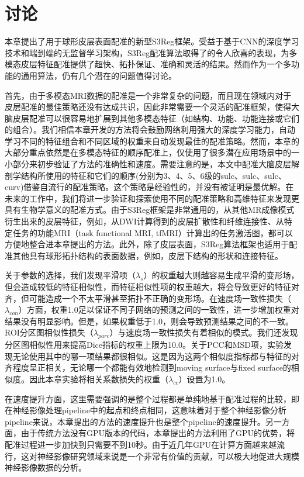 \section{讨论}
本章提出了用于球形皮层表面配准的新型S3Reg框架。受益于基于CNN的深度学习技术和端到端的无监督学习架构，S3Reg配准算法取得了的令人欣喜的表现，为多模态皮层特征配准提供了超快、拓扑保证、准确和灵活的结果。然而作为一个多功能的通用算法，仍有几个潜在的问题值得讨论。

首先，由于多模态MRI数据的配准是一个非常复杂的问题，而且现在领域内对于皮层配准的最佳策略还没有达成共识\cite{robinson2014msm,glasser2016multi}，因此非常需要一个灵活的配准框架，使得大脑皮层配准可以很容易地扩展到其他多模态特征（如结构、功能、功能连接或它们的组合）。我们相信本章开发的方法将会鼓励网络利用强大的深度学习能力，自动学习不同的特征组合和不同区域的权重来自动发现最佳的配准策略。然而，本章的大部分重点依然是在多模态特征的顺序配准上，仅使用了很多潜在应用场景中的一小部分来初步验证了方法的准确性和速度。需要注意的是，本文中配准大脑皮层解剖学结构所使用的特征和它们的顺序(分别为3、4、5、6级的sulc、sulc、sulc、curv)借鉴自流行的配准策略\cite{yeo2009spherical,glasser2016multi,robinson2014msm,fischl1999high}。这个策略是经验性的，并没有被证明是最优解。在未来的工作中，我们将进一步验证和探索使用不同的配准策略和高维特征来发现更具有生物学意义的配准方式。由于S3Reg框架是非常通用的，从其他MR成像模式衍生出来的皮层特征，例如，从DWI计算得到的皮层扩散性和纤维连接性\cite{li2010cortical,li2015spatiotemporal,rekik2017joint}、从特定任务的功能MRI（task functional MRI, tfMRI）计算出的任务激活图，都可以方便地整合进本章提出的方法。此外，除了皮层表面，S3Reg算法框架也适用于配准其他具有球形拓扑结构的表面数据，例如，皮层下结构的形状和连接特征。

关于参数的选择，我们发现平滑项（$\lambda_s$）的权重越大则越容易生成平滑的变形场，但会造成较低的特征相似性，而特征相似性项的权重越大，将会导致更好的特征对齐，但可能造成一个不太平滑甚至拓扑不正确的变形场。在速度场一致性损失（$\lambda_{con}$）方面，权重1.0足以保证不同子网络的预测之间的一致性，进一步增加权重对结果没有明显影响。但是，如果权重低于1.0，则会导致预测结果之间的不一致。ROI分区图相似性损失（$\lambda_{parc}$）与速度场一致性损失有着相似的模式。我们还发现分区图相似性用来提高Dice指标的权重上限为10.0。关于PCC和MSD项，实验发现无论使用其中的哪一项结果都很相似。这是因为这两个相似度指标都与特征的对齐程度呈正相关，无论哪一个都能有效地检测到moving surface与fixed surface的相似度。因此本章实验将相关系数损失的权重（$\lambda_{cc}$）设置为1.0。

在速度提升方面，这里需要强调的是整个过程都是单纯地基于配准过程的比较，即在神经影像处理pipeline中的起点和终点相同，这意味着对于整个神经影像分析pipeline来说，本章提出的方法的速度提升也是整个pipeline的速度提升。另一方面，由于传统方法没有GPU版本的代码，本章提出的方法利用了GPU的优势，将配准过程进一步加快到只需要不到10秒。由于近几年GPU在计算方面越来越流行，这对神经影像研究领域来说是一个非常有价值的贡献，可以极大地促进大规模神经影像数据的分析。

